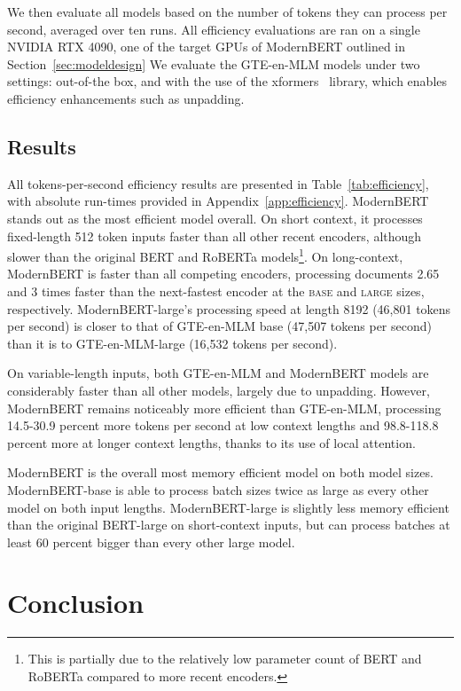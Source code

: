 \documentclass[11pt]{article}
\begin{document}
We then evaluate all models based on the number of tokens they can process per second, averaged over ten runs. All efficiency evaluations are ran on a single NVIDIA RTX 4090, one of the target GPUs of ModernBERT outlined in Section~\ref{sec:modeldesign}
We evaluate the GTE-en-MLM models under two settings: out-of-the box, and with the use of the xformers~\cite{xformers} library, which enables efficiency enhancements such as unpadding.
\subsection{Results}

All tokens-per-second efficiency results are presented in Table~\ref{tab:efficiency}, with absolute run-times provided in Appendix~\ref{app:efficiency}. ModernBERT stands out as the most efficient model overall. On short context, it processes fixed-length 512 token inputs faster than all other recent encoders, although slower than the original BERT and RoBERTa models\footnote{This is partially due to the relatively low parameter count of BERT and RoBERTa compared to more recent encoders.}. On long-context, ModernBERT is faster than all competing encoders, processing documents 2.65 and 3 times faster than the next-fastest encoder at the \textsc{base} and \textsc{large} sizes, respectively. ModernBERT-large's processing speed at length 8192 (46,801 tokens per second) is closer to that of GTE-en-MLM base (47,507 tokens per second) than it is to GTE-en-MLM-large (16,532 tokens per second).

On variable-length inputs, both GTE-en-MLM and ModernBERT models are considerably faster than all other models, largely due to unpadding. However, ModernBERT remains noticeably more efficient than GTE-en-MLM, processing 14.5-30.9 percent more tokens per second at low context lengths and 98.8-118.8 percent more at longer context lengths, thanks to its use of local attention.

ModernBERT is the overall most memory efficient model on both model sizes. ModernBERT-base is able to process batch sizes twice as large as every other model on both input lengths. ModernBERT-large is slightly less memory efficient than the original BERT-large on short-context inputs, but can process batches at least 60 percent bigger than every other large model.

\section{Conclusion}
\end{document}

